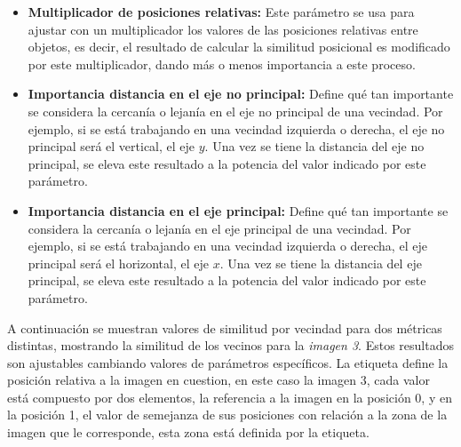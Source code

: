 \begin{itemize}
    \item \textbf{Multiplicador de posiciones relativas:} Este parámetro se usa para ajustar con un multiplicador los valores de las posiciones relativas entre objetos, es decir, el resultado de calcular la similitud posicional es modificado por este multiplicador, dando m\'as o menos importancia a este proceso. 

    \item \textbf{Importancia distancia en el eje no principal:} Define qué tan importante se considera la cercanía o lejanía en el eje no principal de una vecindad. Por ejemplo, si se est\'a trabajando en una vecindad izquierda o derecha, el eje no principal será el vertical, el eje $y$. Una vez se tiene la distancia del eje no principal, se eleva este resultado a la potencia del valor indicado por este par\'ametro.

    \item \textbf{Importancia distancia en el eje principal:} Define qué tan importante se considera la cercanía o lejanía en el eje principal de una vecindad. Por ejemplo, si se est\'a trabajando en una vecindad izquierda o derecha, el eje principal será el horizontal, el eje $x$. Una vez se tiene la distancia del eje principal, se eleva este resultado a la potencia del valor indicado por este par\'ametro.
\end{itemize}

A continuación se muestran valores de similitud por vecindad para dos métricas distintas, mostrando la similitud de los vecinos para la \textit{imagen 3}. Estos resultados son ajustables cambiando valores de parámetros espec\'ificos. La etiqueta define la posición relativa a la imagen en cuestion, en este caso la imagen 3, cada valor está compuesto por dos elementos, la referencia a la imagen en la posici\'on 0, y en la posici\'on 1, el valor de semejanza de sus posiciones con relación a la zona de la imagen que le corresponde, esta zona est\'a definida por la etiqueta.

